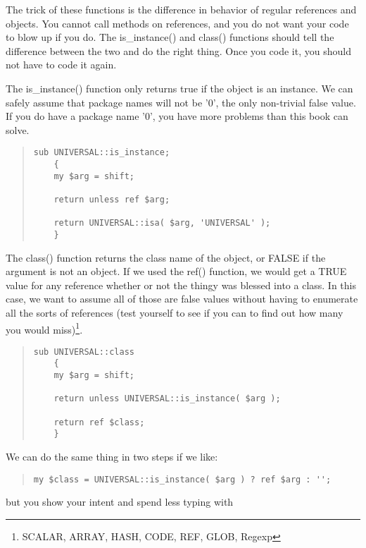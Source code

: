 The trick of these functions is the difference in behavior of
regular references and objects.  You cannot call methods on
references, and you do not want your code to blow up if you
do.  The is\_instance() and class() functions should tell
the difference between the two and do the right thing.  Once
you code it, you should not have to code it again.

The is\_instance() function only returns true if the object
is an instance.  We can safely assume that package names will
not be '0', the only non-trivial false value.  If you do have 
a package name '0', you have more problems than this book can
solve.

\begin{quote}
\begin{verbatim}
sub UNIVERSAL::is_instance;
	{
	my $arg = shift;
	
	return unless ref $arg;
	
	return UNIVERSAL::isa( $arg, 'UNIVERSAL' );
	}
\end{verbatim}
\end{quote}


The class() function returns the class name of the object, or FALSE if 
the argument is not an object.  If we used the ref() function, we
would get a TRUE value for any reference whether or not the thingy
was blessed into a class.  In this case, we want to assume all of
those are false values without having to enumerate all the sorts 
of references (test yourself to see if you can to find out how
many you would miss)\footnote{ SCALAR, ARRAY, HASH, CODE, REF, GLOB,
Regexp }.


\begin{quote}
\begin{verbatim}
sub UNIVERSAL::class
	{
	my $arg = shift;
	
	return unless UNIVERSAL::is_instance( $arg );
	
	return ref $class;
	}
\end{verbatim}
\end{quote}

We can do the same thing in two steps if we like:

\begin{quote}
\begin{verbatim}
my $class = UNIVERSAL::is_instance( $arg ) ? ref $arg : '';
\end{verbatim}
\end{quote}
	
but you show your intent and spend less typing with

